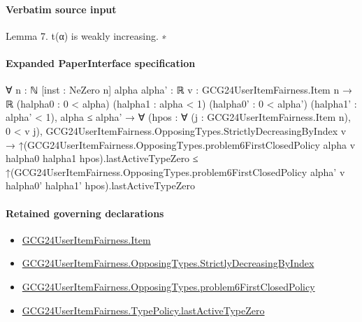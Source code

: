 \documentclass[10pt]{article}
\begin{document}
\paragraph{Verbatim source input}
\begin{ReviewVerbatim}
Lemma 7. t(α) is weakly increasing.
∗
\end{ReviewVerbatim}



\paragraph{Expanded PaperInterface specification}
\begin{ReviewVerbatim}
∀ {n : ℕ} [inst : NeZero n] {alpha alpha' : ℝ} {v : GCG24UserItemFairness.Item n → ℝ} (halpha0 : 0 < alpha)
  (halpha1 : alpha < 1) (halpha0' : 0 < alpha') (halpha1' : alpha' < 1),
  alpha ≤ alpha' →
    ∀ (hpos : ∀ (j : GCG24UserItemFairness.Item n), 0 < v j),
      GCG24UserItemFairness.OpposingTypes.StrictlyDecreasingByIndex v →
        ↑(GCG24UserItemFairness.OpposingTypes.problem6FirstClosedPolicy alpha v halpha0 halpha1
                hpos).lastActiveTypeZero ≤
          ↑(GCG24UserItemFairness.OpposingTypes.problem6FirstClosedPolicy alpha' v halpha0' halpha1'
                hpos).lastActiveTypeZero
\end{ReviewVerbatim}

\paragraph{Retained governing declarations}
\begin{itemize}\raggedright
\item \hyperlink{governing-declaration-a7c560a429c6e204}{GCG24\allowbreak{}User\allowbreak{}Item\allowbreak{}Fairness.\allowbreak{}Item}
\item \hyperlink{governing-declaration-8278344d2ddef9a8}{GCG24\allowbreak{}User\allowbreak{}Item\allowbreak{}Fairness.\allowbreak{}Opposing\allowbreak{}Types.\allowbreak{}Strictly\allowbreak{}Decreasing\allowbreak{}By\allowbreak{}Index}
\item \hyperlink{governing-declaration-c9eb0ce285dbfd64}{GCG24\allowbreak{}User\allowbreak{}Item\allowbreak{}Fairness.\allowbreak{}Opposing\allowbreak{}Types.\allowbreak{}problem6\allowbreak{}First\allowbreak{}Closed\allowbreak{}Policy}
\item \hyperlink{governing-declaration-8a85b9f21510683a}{GCG24\allowbreak{}User\allowbreak{}Item\allowbreak{}Fairness.\allowbreak{}Type\allowbreak{}Policy.\allowbreak{}last\allowbreak{}Active\allowbreak{}Type\allowbreak{}Zero}
\end{itemize}
\end{document}
